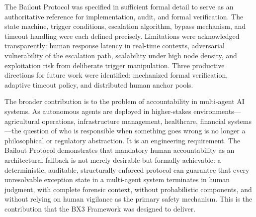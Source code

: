 The Bailout Protocol was specified in sufficient formal detail to serve as an authoritative reference for implementation, audit, and formal verification. The state machine, trigger conditions, escalation algorithm, bypass mechanism, and timeout handling were each defined precisely. Limitations were acknowledged transparently: human response latency in real-time contexts, adversarial vulnerability of the escalation path, scalability under high node density, and exploitation risk from deliberate trigger manipulation. Three productive directions for future work were identified: mechanized formal verification, adaptive timeout policy, and distributed human anchor pools.

The broader contribution is to the problem of accountability in multi-agent AI systems. As autonomous agents are deployed in higher-stakes environments---agricultural operations, infrastructure management, healthcare, financial systems---the question of who is responsible when something goes wrong is no longer a philosophical or regulatory abstraction. It is an engineering requirement. The Bailout Protocol demonstrates that mandatory human accountability as an architectural fallback is not merely desirable but formally achievable: a deterministic, auditable, structurally enforced protocol can guarantee that every unresolvable exception state in a multi-agent system terminates in human judgment, with complete forensic context, without probabilistic components, and without relying on human vigilance as the primary safety mechanism. This is the contribution that the BX3 Framework was designed to deliver.